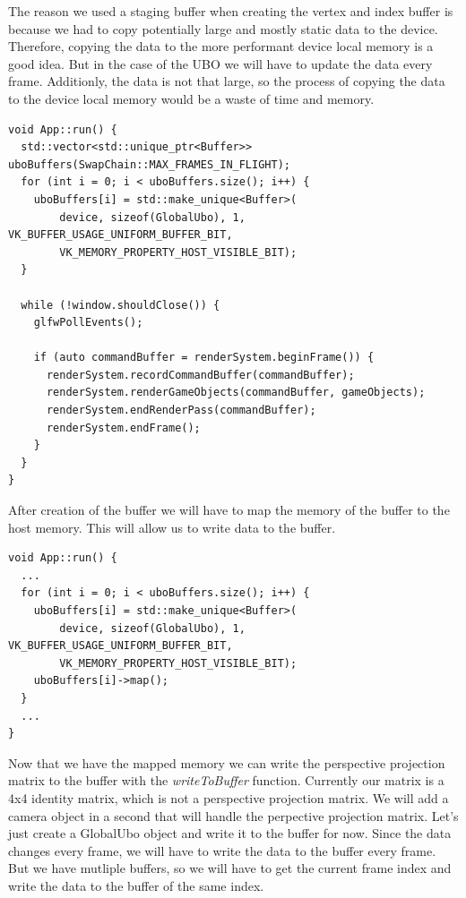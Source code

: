 \documentclass[12pt]{report} \usepackage{preamble}
\begin{document}
The reason we used a staging buffer when creating the vertex and index buffer is because we had to copy potentially large and mostly static data to the device.
Therefore, copying the data to the more performant device local memory is a good idea. But in the case of the \ac{UBO} we will have to update the data every frame.
Additionly, the data is not that large, so the process of copying the data to the device local memory would be a waste of time and memory.

\begin{lstlisting}[Language=C++]
void App::run() {
  std::vector<std::unique_ptr<Buffer>> uboBuffers(SwapChain::MAX_FRAMES_IN_FLIGHT);
  for (int i = 0; i < uboBuffers.size(); i++) {
    uboBuffers[i] = std::make_unique<Buffer>(
        device, sizeof(GlobalUbo), 1, VK_BUFFER_USAGE_UNIFORM_BUFFER_BIT,
        VK_MEMORY_PROPERTY_HOST_VISIBLE_BIT);
  }

  while (!window.shouldClose()) {
    glfwPollEvents();

    if (auto commandBuffer = renderSystem.beginFrame()) {
      renderSystem.recordCommandBuffer(commandBuffer);
      renderSystem.renderGameObjects(commandBuffer, gameObjects);
      renderSystem.endRenderPass(commandBuffer);
      renderSystem.endFrame();
    }
  }
}
\end{lstlisting}

After creation of the buffer we will have to map the memory of the buffer to the host memory. This will allow us to write data to the buffer.

\begin{lstlisting}[Language=C++]
void App::run() {
  ...
  for (int i = 0; i < uboBuffers.size(); i++) {
    uboBuffers[i] = std::make_unique<Buffer>(
        device, sizeof(GlobalUbo), 1, VK_BUFFER_USAGE_UNIFORM_BUFFER_BIT,
        VK_MEMORY_PROPERTY_HOST_VISIBLE_BIT);
    uboBuffers[i]->map();
  }
  ...
}
\end{lstlisting}

Now that we have the mapped memory we can write the perspective projection matrix to the buffer with the \textit{writeToBuffer} function.
Currently our matrix is a 4x4 identity matrix, which is not a perspective projection matrix. We will add a camera object in a second that will handle the perpective projection matrix.
Let's just create a GlobalUbo object and write it to the buffer for now. Since the data changes every frame, we will have to write the data to the buffer every frame. But we
have mutliple buffers, so we will have to get the current frame index and write the data to the buffer of the same index.
\end{document}
